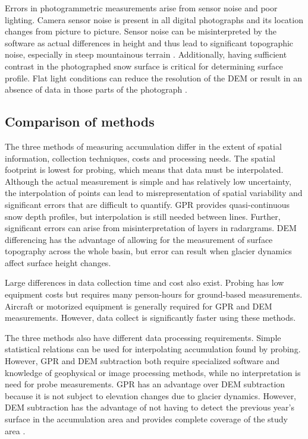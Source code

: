 \documentclass{sfuthesis}
\begin{document}
{\begin{appendices}
Errors in photogrammetric measurements arise from sensor noise and poor lighting. Camera sensor noise is present in all digital photographs and its location changes from picture to picture. Sensor noise can be misinterpreted by the software as actual differences in height and thus lead to significant topographic noise, especially in steep mountainous terrain \citep{Nolan2015}. Additionally, having sufficient contrast in the photographed snow surface is critical for determining surface profile. Flat light conditions can reduce the resolution of the DEM or result in an absence of data in those parts of the photograph \citep{Nolan2015}. 

\subsection{Comparison of methods}
\label{sec:comparemethods}
The three methods of measuring accumulation differ in the extent of spatial information, collection techniques, costs and processing needs. The spatial footprint is lowest for probing, which means that data must be interpolated. Although the actual measurement is simple and has relatively low uncertainty, the interpolation of points can lead to misrepresentation of spatial variability and significant errors that are difficult to quantify. GPR provides quasi-continuous snow depth profiles, but interpolation is still needed between lines. Further, significant errors can arise from misinterpretation of layers in radargrams. DEM differencing has the advantage of allowing for the measurement of surface topography across the whole basin, but error can result when glacier dynamics affect surface height changes. 

Large differences in data collection time and cost also exist. Probing has low equipment costs but requires many person-hours for ground-based measurements. Aircraft or motorized equipment is generally required for GPR and DEM measurements. However, data collect is significantly faster using these methods.  

The three methods also have different data processing requirements. Simple statistical relations can be used for interpolating accumulation found by probing. However, GPR and DEM subtraction both require specialized software and knowledge of geophysical or image processing methods, while no interpretation is need for probe measurements. GPR has an advantage over DEM subtraction because it is not subject to elevation changes due to glacier dynamics. However, DEM subtraction has the advantage of not having to detect the previous year's surface in the accumulation area and provides complete coverage of the study area \citep{Sold2013}. 


\end{appendices}}
\end{document}
